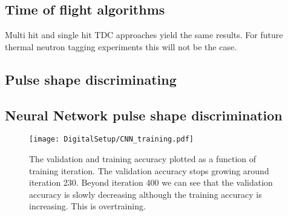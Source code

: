 \documentclass[main.tex]{subfiles}
\begin{document}
\subsection{Time of flight algorithms}
Multi hit and single hit TDC approaches yield the same results. For future thermal neutron tagging experiments this will not be the case.
\subsection{Pulse shape discriminating}
\subsection{Neural Network pulse shape discrimination}
\begin{figure}[ht!]
    \centering
        \texttt{[image: DigitalSetup/CNN\_training.pdf]}
        \caption{The validation and training accuracy plotted as a function of training iteration. The validation accuracy stops growing around iteration 230. Beyond iteration 400 we can see that the validation accuracy is slowly decreasing although the training accuracy is increasing. This is overtraining.}
    \label{fig:CNN_training} 
\end{figure}
\end{document}
